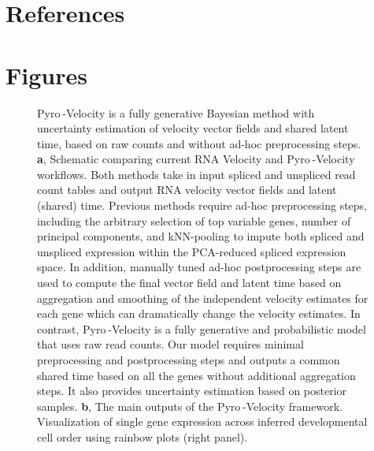 \documentclass[
  sn-mathphys-num,
  lineno,
  twocolumn]{sn-jnl}
\begin{document}
\section*{References}\label{references}

\renewcommand{\bibsection}{}


\FloatBarrier

\newpage{}

\onecolumn

\section{Figures}\label{figures}

\begin{figure}


\caption{\label{fig-model}Pyro -Velocity is a fully generative Bayesian
method with uncertainty estimation of velocity vector fields and shared
latent time, based on raw counts and without ad-hoc preprocessing steps.
\textbf{a}, Schematic comparing current RNA Velocity and Pyro -Velocity
workflows. Both methods take in input spliced and unspliced read count
tables and output RNA velocity vector fields and latent (shared) time.
Previous methods require ad-hoc preprocessing steps, including the
arbitrary selection of top variable genes, number of principal
components, and kNN-pooling to impute both spliced and unspliced
expression within the PCA-reduced spliced expression space. In addition,
manually tuned ad-hoc postprocessing steps are used to compute the final
vector field and latent time based on aggregation and smoothing of the
independent velocity estimates for each gene which can dramatically
change the velocity estimates. In contrast, Pyro -Velocity is a fully
generative and probabilistic model that uses raw read counts. Our model
requires minimal preprocessing and postprocessing steps and outputs a
common shared time based on all the genes without additional aggregation
steps. It also provides uncertainty estimation based on posterior
samples. \textbf{b}, The main outputs of the Pyro -Velocity framework.
Visualization of single gene expression across inferred developmental
cell order using rainbow plots (right panel).}

\end{figure}%
\end{document}
